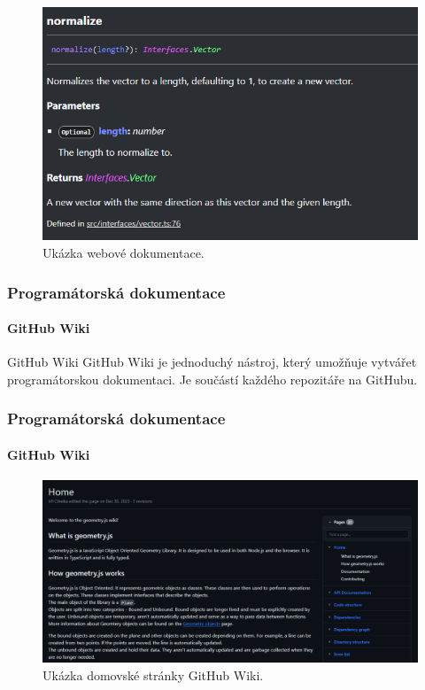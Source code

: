 \begin{frame}
{\begin{figure}
            \centering
            \includegraphics[height=0.65\textheight]{../resources/vector-normalize-documentation-typedoc.png}
            \caption{Ukázka webové dokumentace.}
        \end{figure}
    }
\end{frame}


\begin{frame}
    \frametitle{Programátorská dokumentace}
    \framesubtitle{GitHub Wiki}
     {
        \begin{block}{GitHub Wiki}
            GitHub Wiki je jednoduchý nástroj, který umožňuje vytvářet programátorskou dokumentaci.
            Je součástí každého repozitáře na GitHubu.
        \end{block}
    }
\end{frame}
\begin{frame}
    \frametitle{Programátorská dokumentace}
    \framesubtitle{GitHub Wiki}
    \begin{figure}
        \centering
        \includegraphics[height=0.6\textheight]{../resources/github-wiki-home.png}
        \caption{Ukázka domovské stránky GitHub Wiki.}
    \end{figure}
\end{frame}
